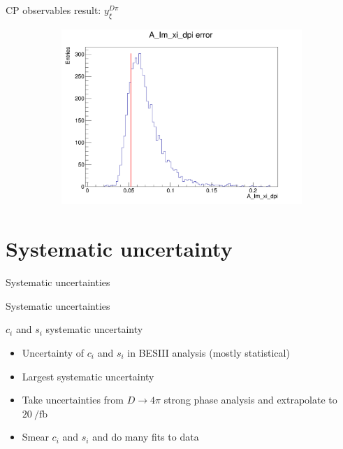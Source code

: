 \documentclass{beamer}
\begin{document}
\begin{frame}{CP observables result: $y_\xi^{D\pi}$}
\begin{figure}
\begin{subfigure}{0.42\textwidth}
      \includegraphics[width = 1.0\textwidth]{Plots/A_Im_xi_dpi_error_WithDataUncertainty.png}
    \end{subfigure}
  \end{figure}
\end{frame}

\section{Systematic uncertainty}
\begin{frame}{Systematic uncertainties}
  \begin{center}
    {\huge Systematic uncertainties}
  \end{center}
\end{frame}

\begin{frame}{$c_i$ and $s_i$ systematic uncertainty}
  \begin{itemize}
    \setlength\itemsep{1.5em}
    \item{Uncertainty of $c_i$ and $s_i$ in BESIII analysis (mostly statistical)}
    \item{Largest systematic uncertainty}
    \item{Take uncertainties from $D\to4\pi$ strong phase analysis and extrapolate to $\SI{20}{\per\femto\barn}$}
    \item{Smear $c_i$ and $s_i$ and do many fits to data}
  \end{itemize}
\end{frame}
\end{document}
